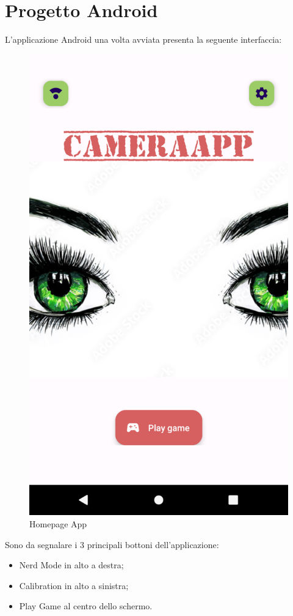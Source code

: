 \documentclass[11pt]{article}
\begin{document}
\newpage
\section{Progetto Android}
L'applicazione Android una volta avviata presenta la seguente interfaccia:
\begin{figure}[h]
\caption{Homepage App }
\centering
\includegraphics[scale=0.2]{img/home.png}
\end{figure}

Sono da segnalare i 3 principali bottoni dell'applicazione:
\begin{itemize}
\item Nerd Mode in alto a destra;
\item Calibration in alto a sinistra;
\item Play Game al centro dello schermo.
\end{itemize}
\end{document}
